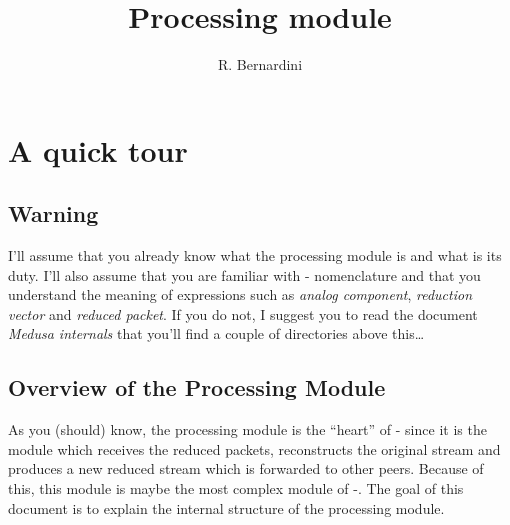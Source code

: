 \documentclass{medusabook}
\title{Processing module}
\author{R. Bernardini}
\begin{document}
  \maketitle
\tableofcontents

\chapter{A quick tour}
\label{chap:0;dsp_book}

\section{Warning}
\label{sect:0.0;dsp_book}

I'll assume that you already know what the processing module is and
what is its duty.  I'll also assume that you are familiar with
\medusa- nomenclature and that you understand the meaning of
expressions such as \emph{analog component}, \emph{reduction vector}
and \emph{reduced packet}.  If you do not, I suggest you to read the
document \emph{Medusa internals} that you'll find a couple of
directories above this\ldots

\section{Overview of the Processing Module}
\label{sect:0.1;dsp_book}

As you (should) know, the processing module is the ``heart'' of
\medusa- since it is the module which receives the reduced packets,
reconstructs the original stream and produces a new reduced stream
which is forwarded to other peers.  Because of this, this module is
maybe the most complex module of \medusa-.  The goal of this document
is to explain the internal structure of the processing module.
\end{document}
